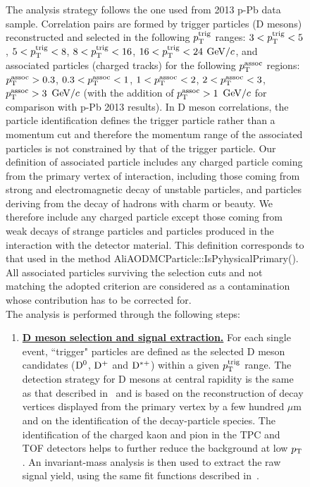 \begin{enumerate}
\begin{figure}
The analysis strategy follows the one used from 2013 p-Pb data sample. Correlation pairs are formed by
trigger particles (D mesons) reconstructed and selected in the following $p_{\rm T}^{\rm trig}$ ranges: $3<p_{\rm T}^{\rm trig}<5$, $5<p_{\rm T}^{\rm trig}<8$, $8<p_{\rm T}^{\rm trig}<16$, $16<p_{\rm T}^{\rm trig}<24$ $\mathrm{GeV}/c$, and associated particles (charged tracks) for the following $p_{\rm T}^{\rm assoc}$ regions: $p_{\rm T}^{\rm assoc}>0.3$, $0.3<p_{\rm T}^{\rm assoc}<1$, $1<p_{\rm T}^{\rm assoc}<2$, $2<p_{\rm T}^{\rm assoc}<3$, $p_{\rm T}^{\rm assoc}>3$ $\mathrm{GeV}/c$ (with the addition of $p_{\rm T}^{\rm assoc}>1$ $\mathrm{GeV}/c$ for comparison with p-Pb 2013 results). In D meson correlations, the particle identification
defines the trigger particle rather than a momentum cut and therefore the momentum range of the associated particles is not constrained by that of the trigger particle. Our definition of associated particle includes any charged particle coming from the primary vertex of interaction, including
those coming from strong and electromagnetic decay of unstable particles, and particles deriving from the
decay of hadrons with charm or beauty.
We therefore include any charged particle except those coming from weak decays of strange particles and particles produced in the interaction with the detector material. This definition corresponds to that used in the method AliAODMCParticle::IsPyhysicalPrimary().
All associated particles surviving the selection cuts and not matching the adopted criterion are considered as a contamination whose contribution has to be corrected for. \\

The analysis is performed through the following steps:

\begin{enumerate}

\item
\underline {\bf D meson selection and signal extraction.}  For each single event, ``trigger" particles
are defined as the selected  D meson candidates (${\rm D^0}$, ${\rm D^+}$ and ${\rm D^{*+}}$)
within a given $p_{\rm T}^{\rm trig}$ range. The detection strategy for D mesons at central rapidity is
the same as that described in~\cite{ALICEDmespp7Tev} and is based on the reconstruction of decay
vertices displayed from the primary vertex by a few hundred $\mu$m and on the identification of the decay-particle species.
The identification of the charged kaon and pion in the TPC and TOF
detectors helps to further reduce the background at low $p_{\rm T}$.  An
invariant-mass analysis is then used to extract the raw signal yield, using
the same fit functions described in~\cite{ALICEDmespp7Tev}.



\end{enumerate}
\end{figure}
\end{enumerate}
